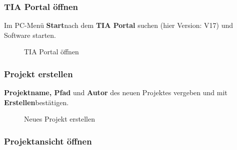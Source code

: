 \subsubsection{TIA Portal öffnen}

Im PC-Menü \glqq\textbf{Start}\grqq\:nach dem \textbf{TIA Portal} suchen (hier Version: V17) und Software starten.
\begin{figure}[H]
   \centering
   \caption[TIA Portal öffnen]{TIA Portal öffnen}
   \label{fig:Bild2.1}
\end{figure}

\subsubsection{Projekt erstellen}

\textbf{Projektname, Pfad} und \textbf{Autor} des neuen Projektes vergeben und mit \glqq\textbf{Erstellen}\grqq\:bestätigen.
\begin{figure}[H]
   \centering
   \caption[Neues Projekt erstellen]{Neues Projekt erstellen}
   \label{fig:Bild2.2}
\end{figure}

\clearpage

\subsubsection{Projektansicht öffnen}

